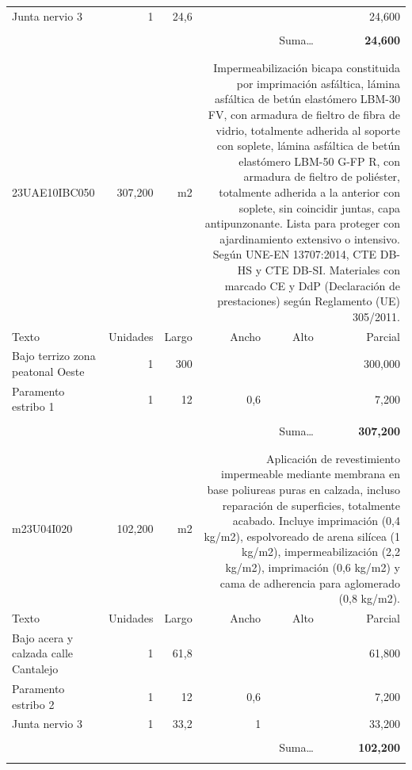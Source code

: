 \documentclass{book}%
\begin{document}
\begin{longtable}{lrrrrr}
\hline%
\multicolumn{1}{p{3.5cm}}{Junta nervio 3}&1&24,6&&&    24,600\\%
&&&&&\\%
\multicolumn{5}{r}{Suma\ldots}&\textbf{    24,600}\\%
\hline%
&&&&&\\%
&&&&&\\%
23UAE10IBC050&   307,200& m2&\multicolumn{3}{p{6cm}}{\scriptsize Impermeabilización bicapa constituida por imprimación asfáltica, lámina asfáltica de betún elastómero LBM-30 FV, con armadura de fieltro de fibra de vidrio, totalmente adherida al soporte con soplete, lámina asfáltica de betún elastómero LBM-50 G-FP R, con armadura de fieltro de poliéster, totalmente adherida a la anterior con soplete, sin coincidir juntas, capa antipunzonante. Lista para proteger con ajardinamiento extensivo o intensivo. Según UNE-EN 13707:2014, CTE DB-HS y CTE DB-SI. Materiales con marcado CE y DdP (Declaración de prestaciones) según Reglamento (UE) 305/2011.\normalsize}\\%
Texto&Unidades&Largo&Ancho&Alto&Parcial\\%
\hline%
\multicolumn{1}{p{3.5cm}}{Bajo terrizo zona peatonal Oeste }&1&300&&&   300,000\\%
\multicolumn{1}{p{3.5cm}}{Paramento estribo 1}&1&12&0,6&&     7,200\\%
&&&&&\\%
\multicolumn{5}{r}{Suma\ldots}&\textbf{   307,200}\\%
\hline%
&&&&&\\%
&&&&&\\%
m23U04I020&   102,200& m2&\multicolumn{3}{p{6cm}}{\scriptsize Aplicación de revestimiento impermeable mediante membrana en base poliureas puras en calzada, incluso reparación de superficies, totalmente acabado. Incluye imprimación (0,4 kg/m2), espolvoreado de arena silícea (1 kg/m2), impermeabilización (2,2 kg/m2), imprimación (0,6 kg/m2) y cama de adherencia para aglomerado (0,8 kg/m2).\normalsize}\\%
Texto&Unidades&Largo&Ancho&Alto&Parcial\\%
\hline%
\multicolumn{1}{p{3.5cm}}{Bajo acera y calzada calle Cantalejo}&1&61,8&&&    61,800\\%
\multicolumn{1}{p{3.5cm}}{Paramento estribo 2}&1&12&0,6&&     7,200\\%
\multicolumn{1}{p{3.5cm}}{Junta nervio 3}&1&33,2&1&&    33,200\\%
&&&&&\\%
\multicolumn{5}{r}{Suma\ldots}&\textbf{   102,200}\\%
\hline%
&&&&&\\%
\end{longtable}%
\newpage
\end{document}
